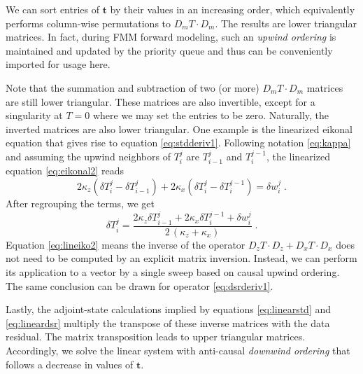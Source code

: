 We can sort entries of $\mathbf{t}$ by their values in an increasing order, which 
equivalently performs column-wise permutations to $D_m T \cdot D_m$. The results are lower triangular matrices. 
In fact, during FMM forward modeling, such an \textit{upwind ordering} is maintained and updated by the priority 
queue and thus can be conveniently imported for usage here.

Note that the summation and subtraction of two (or more) $D_m T \cdot D_m$ matrices are still lower 
triangular. These matrices are also invertible, except for a singularity at $T = 0$ where we may set the entries 
to be zero. Naturally, the inverted matrices are also lower triangular. One example is the linearized eikonal 
equation that gives rise to equation \ref{eq:stdderiv1}. Following notation \ref{eq:kappa} and assuming the 
upwind neighbors of $T_i^j$ are $T_{i-1}^j$ and $T_i^{j-1}$, the linearized equation \ref{eq:eikonal2} reads
\begin{equation}
\label{eq:lineiko}
2 \kappa_z (\delta T_i^j - \delta T_{i-1}^j) + 
2 \kappa_x (\delta T_i^j - \delta T_i^{j-1}) = \delta w_i^j\;.
\end{equation}
After regrouping the terms, we get
\begin{equation}
\label{eq:lineiko2}
\delta T_i^j = 
\frac{2 \kappa_z \delta T_{i-1}^j + 2 \kappa_x \delta T_i^{j-1} + \delta w_i^j}{2\,(\kappa_z + \kappa_x)}\;.
\end{equation}
Equation \ref{eq:lineiko2} means the inverse of the operator $D_z T \cdot D_z + D_x T \cdot D_x$ does not 
need to be computed by an explicit matrix inversion. Instead, we can perform its application to a 
vector by a single sweep based on causal upwind ordering. The same conclusion can be drawn for operator 
\ref{eq:dsrderiv1}.

Lastly, the adjoint-state calculations implied by equations \ref{eq:linearstd} and 
\ref{eq:lineardsr} multiply the transpose of these inverse matrices with the data residual. The matrix 
transposition leads to upper triangular matrices. Accordingly, we solve the linear system with anti-causal 
\textit{downwind ordering} that follows a decrease in values of $\mathbf{t}$.



